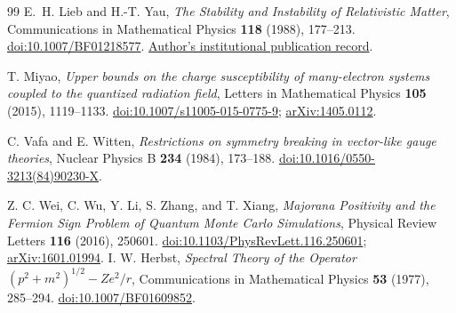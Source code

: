 \begin{thebibliography}{99}
E.~H. Lieb and H.-T. Yau,
\emph{The Stability and Instability of Relativistic Matter},
Communications in Mathematical Physics \textbf{118} (1988), 177--213.
\href{https://doi.org/10.1007/BF01218577}{doi:10.1007/BF01218577}.
\href{https://collaborate.princeton.edu/en/publications/the-stability-and-instability-of-relativistic-matter-2/}{Author's institutional publication record}.

T. Miyao, \emph{Upper bounds on the charge susceptibility of many-electron
systems coupled to the quantized radiation field},
Letters in Mathematical Physics \textbf{105} (2015), 1119--1133.
\href{https://doi.org/10.1007/s11005-015-0775-9}{doi:10.1007/s11005-015-0775-9};
\href{https://arxiv.org/abs/1405.0112}{arXiv:1405.0112}.

C. Vafa and E. Witten,
\emph{Restrictions on symmetry breaking in vector-like gauge theories},
Nuclear Physics B \textbf{234} (1984), 173--188.
\href{https://doi.org/10.1016/0550-3213(84)90230-X}{doi:10.1016/0550-3213(84)90230-X}.

Z. C. Wei, C. Wu, Y. Li, S. Zhang, and T. Xiang,
\emph{Majorana Positivity and the Fermion Sign Problem of Quantum Monte Carlo Simulations},
Physical Review Letters \textbf{116} (2016), 250601.
\href{https://doi.org/10.1103/PhysRevLett.116.250601}{doi:10.1103/PhysRevLett.116.250601};
\href{https://arxiv.org/abs/1601.01994}{arXiv:1601.01994}.
I. W. Herbst,
\emph{Spectral Theory of the Operator \((p^2+m^2)^{1/2}-Ze^2/r\)},
Communications in Mathematical Physics \textbf{53} (1977), 285--294.
\href{https://doi.org/10.1007/BF01609852}{doi:10.1007/BF01609852}.
\end{thebibliography}
